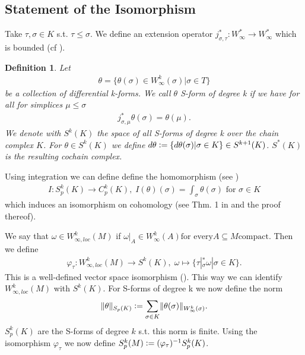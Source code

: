 \documentclass[12pt,a4paper]{article}
\newtheorem{definition}{Definition}
\begin{document}
\subsection{Statement of the Isomorphism}

Take $\tau, \sigma \in K$ s.t. $\tau \leq \sigma$.  We define an extension 
operator $j^*_{\sigma, \tau}:W^*_\infty \rightarrow W^*_\infty $ which is 
bounded (cf \cite[p.191]{goldshtein}). 
\begin{definition}
    Let 
    \begin{align*}
    \theta = \{ \theta(\sigma) \in W^k_\infty(\sigma) | \sigma \in T\}
    \end{align*}
    be a collection of differential k-forms. We call $\theta$ S-form of degree
    k if we have for all for simplices
    $\mu \leq \sigma$ 
    \begin{align*}
    j^*_{\sigma,\mu}\theta(\sigma) = \theta(\mu).
    \end{align*}
    We denote with $S^k(K)$ the space of all S-forms of degree k over the chain
    complex $K$. 
For $\theta \in S^k(K)$ we define $d\theta \vcentcolon= \{ d\theta(\sigma) | 
\sigma \in K \} \in S^{k+1}(K)$. $S^*(K)$ is the resulting cochain complex.
\end{definition}

Using integration we can define define the homomorphism 
(see \cite[p.191]{goldshtein})
\begin{align*}
I: S_p^k(K) \rightarrow C_p^k(K), \; I(\theta)(\sigma) = 
\int_\sigma \theta(\sigma) \text{ for } \sigma \in K
\end{align*}
which induces an isomorphism on cohomology (see Thm. 1 in \cite{goldshtein}
and the proof thereof).

We say that $\omega \in W^k_{\infty,loc}(M)$ 
if $\omega|_A \in W^k_\infty(A) \text{for every} A \subseteq M \text{compact}$.
Then we define 
\begin{align*}
\varphi_\tau: W^k_{\infty,loc}(M) \rightarrow S^k(K), \;
\omega \mapsto \{ \tau|_\sigma^*\omega | \sigma \in K \}.
\end{align*}
This is a well-defined vector space isomorphism (\cite[p.191]{goldshtein}). This
way we can identify $W^k_{\infty,loc}(M)$ with $S^k(K)$. For S-forms of 
degree k we now define the norm
\begin{align*}
\lVert \theta \rVert _{S_p(K)}  \vcentcolon= \sum_{\sigma \in K} 
\lVert \theta(\sigma) \rVert _{W^k_\infty(\sigma)}.
\end{align*} 
$S^k_p(K)$ are the S-forms of degree $k$ s.t. this norm is finite. Using the
isomorphism $\varphi_\tau$ we now define 
$S^k_p(M) \vcentcolon= (\varphi_\tau)^{-1} S^k_p(K)$.
\end{document}
